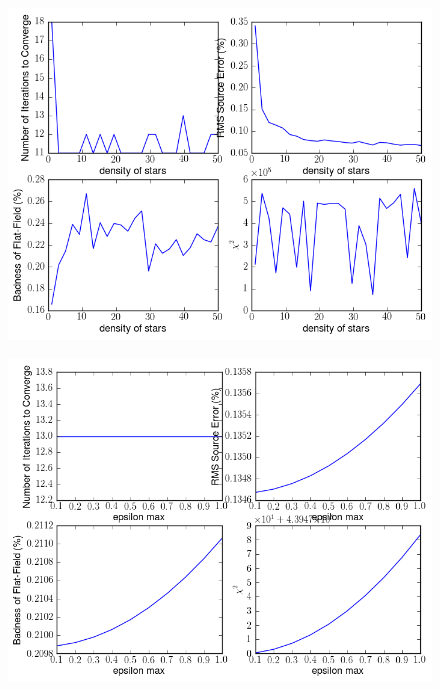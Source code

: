 \documentclass[manuscript]{aastex}
\begin{document}
\begin{figure}[ht]
\begin{center}
\includegraphics[width=\textwidth]{density_of_stars.png}
\end{center}

\end{figure}


\begin{figure}[ht]
\begin{center}
\includegraphics[width=\textwidth]{epsilon_max.png}
\end{center}
\end{figure}
\end{document}
